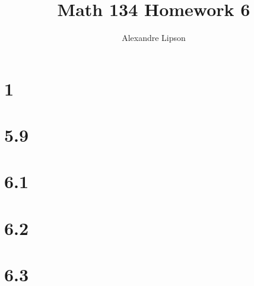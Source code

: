 \documentclass{article}
\title{Math 134 Homework 6}
\author{Alexandre Lipson}
\begin{document}
\maketitle

\section*{1}


\section*{5.9}


\section*{6.1}


\section*{6.2}


\section*{6.3}

\end{document}
